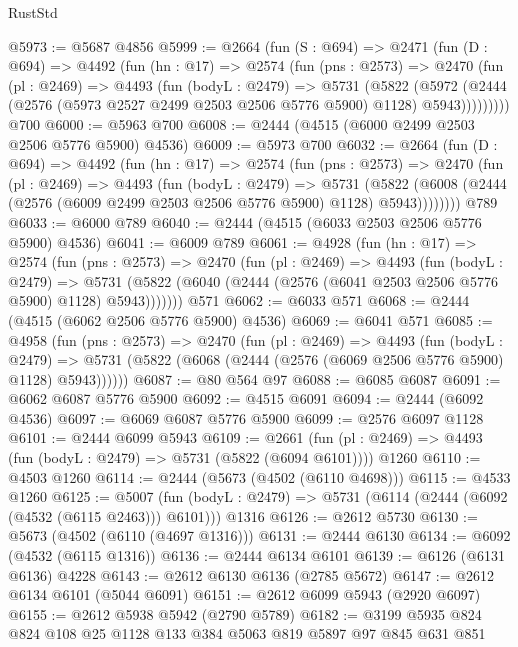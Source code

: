 \begin{lexlean}{RustStd}
\begin{coremodule}
@5973 := @5687 @4856
@5999 := @2664
    (fun (S : @694) =>
    @2471
      (fun (D : @694) =>
      @4492
        (fun (hn : @17) =>
        @2574
          (fun (pns : @2573) =>
          @2470
            (fun (pl : @2469) =>
            @4493
              (fun (bodyL : @2479) =>
              @5731
                (@5822
                  (@5972
                    (@2444 (@2576 (@5973 @2527 @2499 @2503 @2506 @5776 @5900) @1128) @5943)))))))))
    @700
@6000 := @5963 @700
@6008 := @2444 (@4515 (@6000 @2499 @2503 @2506 @5776 @5900) @4536)
@6009 := @5973 @700
@6032 := @2664
    (fun (D : @694) =>
    @4492
      (fun (hn : @17) =>
      @2574
        (fun (pns : @2573) =>
        @2470
          (fun (pl : @2469) =>
          @4493
            (fun (bodyL : @2479) =>
            @5731
              (@5822 (@6008 (@2444 (@2576 (@6009 @2499 @2503 @2506 @5776 @5900) @1128) @5943))))))))
    @789
@6033 := @6000 @789
@6040 := @2444 (@4515 (@6033 @2503 @2506 @5776 @5900) @4536)
@6041 := @6009 @789
@6061 := @4928
    (fun (hn : @17) =>
    @2574
      (fun (pns : @2573) =>
      @2470
        (fun (pl : @2469) =>
        @4493
          (fun (bodyL : @2479) =>
          @5731 (@5822 (@6040 (@2444 (@2576 (@6041 @2503 @2506 @5776 @5900) @1128) @5943)))))))
    @571
@6062 := @6033 @571
@6068 := @2444 (@4515 (@6062 @2506 @5776 @5900) @4536)
@6069 := @6041 @571
@6085 := @4958
    (fun (pns : @2573) =>
    @2470
      (fun (pl : @2469) =>
      @4493
        (fun (bodyL : @2479) =>
        @5731 (@5822 (@6068 (@2444 (@2576 (@6069 @2506 @5776 @5900) @1128) @5943))))))
@6087 := @80 @564 @97
@6088 := @6085 @6087
@6091 := @6062 @6087 @5776 @5900
@6092 := @4515 @6091
@6094 := @2444 (@6092 @4536)
@6097 := @6069 @6087 @5776 @5900
@6099 := @2576 @6097 @1128
@6101 := @2444 @6099 @5943
@6109 := @2661
    (fun (pl : @2469) => @4493 (fun (bodyL : @2479) => @5731 (@5822 (@6094 @6101))))
    @1260
@6110 := @4503 @1260
@6114 := @2444 (@5673 (@4502 (@6110 @4698)))
@6115 := @4533 @1260
@6125 := @5007
    (fun (bodyL : @2479) => @5731 (@6114 (@2444 (@6092 (@4532 (@6115 @2463))) @6101)))
    @1316
@6126 := @2612 @5730
@6130 := @5673 (@4502 (@6110 (@4697 @1316)))
@6131 := @2444 @6130
@6134 := @6092 (@4532 (@6115 @1316))
@6136 := @2444 @6134 @6101
@6139 := @6126 (@6131 @6136) @4228
@6143 := @2612 @6130 @6136 (@2785 @5672)
@6147 := @2612 @6134 @6101 (@5044 @6091)
@6151 := @2612 @6099 @5943 (@2920 @6097)
@6155 := @2612 @5938 @5942 (@2790 @5789)
@6182 := @3199
    @5935
    @824
    @824
    @108
    @25
    @1128
    @133
    @384
    @5063
    @819
    @5897
    @97
    @845
    @631
    @851

\end{coremodule}
\end{lexlean}
